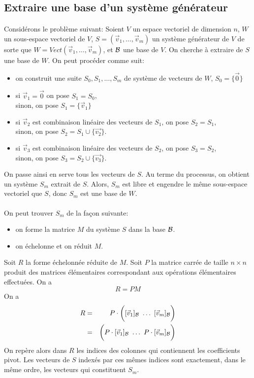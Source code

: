 %
\subsection{Extraire une base d'un système générateur}
%
\paragraph{} Considérons le problème suivant: Soient $V$ un espace vectoriel de dimension $n$, $W$ un sous-espace vectoriel de $V$, $S = (\vec{v}_1, \ldots, \vec{v}_m)$ un système générateur de $V$ de sorte que $W = Vect(\vec{v}_1, \ldots, \vec{v}_m)$, et $\mathcal{B}$ une base de $V$. On cherche à extraire de $S$ une base de $W$. On peut procéder comme suit:
\begin{itemize}
  \item on construit une suite $S_0, S_1, \ldots, S_m$ de système de vecteurs de $W$, $S_0 = \{\vec{0}\}$
  \item si $\vec{v}_1 = \vec{0}$ on pose $S_1 = S_0$, \\
    sinon, on pose $S_1 = \{\vec{v}_1\}$
  \item si $\vec{v}_2$ est combinaison linéaire des vecteurs de $S_1$, on pose $S_2 = S_1$, \\
    sinon, on pose $S_2 = S_1 \cup \{\vec{v_2}\}$.
  \item si $\vec{v}_3$ est combinaison linéaire des vecteurs de $S_2$, on pose $S_3 = S_2$, \\
    sinon, on pose $S_3 = S_2 \cup \{\vec{v_3}\}$.
\end{itemize}
On passe ainsi en serve tous les vecteurs de $S$. Au terme du processus, on obtient un système $S_m$ extrait de $S$. Alors, $S_m$ est libre et engendre le même sous-espace vectoriel que $S$,  donc $S_m$ est une base de $W$. 
\\\\
On peut trouver $S_m$ de la façon suivante:
\begin{itemize}
  \item on forme la matrice $M$ du système $S$ dans la base $\mathcal{B}$.
  \item on échelonne et on réduit $M$.
\end{itemize}
Soit $R$ la forme échelonnée réduite de $M$. Soit $P$ la matrice carrée de taille $n\times n$ produit des matrices élémentaires correspondant aux opérations élémentaires effectuées. On a 
$$R = P M$$
On a 
\begin{eqnarray*}
  R &=& P \cdot \bigg([\vec{v}_1]_{\mathcal{B}} ~ \hdots ~ [\vec{v}_m]_{\mathcal{B}} \bigg) \\
   &=& \bigg(P \cdot [\vec{v}_1]_{\mathcal{B}} ~ \hdots ~ P \cdot [\vec{v}_m]_{\mathcal{B}} \bigg) \\
\end{eqnarray*}
On repère alors dans $R$ les indices des colonnes qui contiennent les coefficients pivot. Les vecteurs de $S$ indexés par ces mêmes indices sont exactement, dans le même ordre, les vecteurs qui constituent $S_m$.

